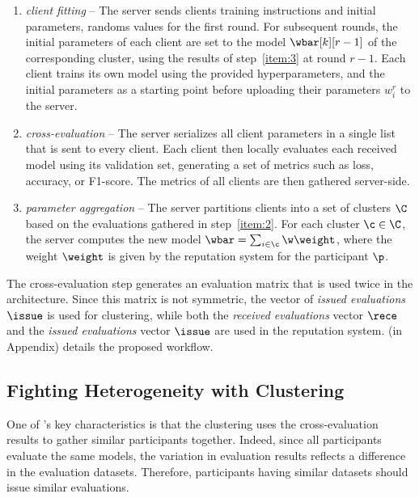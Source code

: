 \begin{enumerate}[label={\arabic*}.]
    \item \emph{client fitting} -- The server sends clients training instructions and initial parameters, \ie randoms values for the first round.
    For subsequent rounds, the initial parameters of each client are set to the model $\wbar[k][r-1]$ of the corresponding cluster, using the results of step~\ref{item:3} at round $r-1$.
    Each client trains its own model using the provided hyperparameters, and the initial parameters as a starting point before uploading their parameters $w_i^r$ to the server.\label{item:1}
    
    \item \emph{cross-evaluation} -- The server serializes all client parameters in a single list that is sent to every client. 
    Each client then locally evaluates each received model using its validation set, generating a set of metrics such as loss, accuracy, or F1-score.
    The metrics of all clients are then gathered server-side. \label{item:2}
    
    \item \emph{parameter aggregation} -- The server partitions clients into a set of clusters $\C$ based on the evaluations gathered in step~\ref{item:2}.
    For each cluster $\c \in \C$, the server computes the new model $\wbar = \sum_{i\in\c} \w \weight$, where the weight $\weight$ is given by the reputation system for the participant $\p$. \label{item:3}
\end{enumerate}

The cross-evaluation step generates an evaluation matrix that is used twice in the architecture.
Since this matrix is not symmetric, the vector of \emph{issued evaluations} $\issue$ is used for clustering, while both the \emph{received evaluations} vector $\rece$ and the \emph{issued evaluations} vector $\issue$ are used in the reputation system. 
 (in Appendix) details the proposed workflow.

\subsection{Fighting Heterogeneity with Clustering}
\label{sec:archi.cluster}

One of \thecontrib's key characteristics is that the clustering uses the cross-evaluation results to gather similar participants together.
Indeed, since all participants evaluate the same models, the variation in evaluation results reflects a difference in the evaluation datasets. 
Therefore, participants having similar datasets should issue similar evaluations.
 
